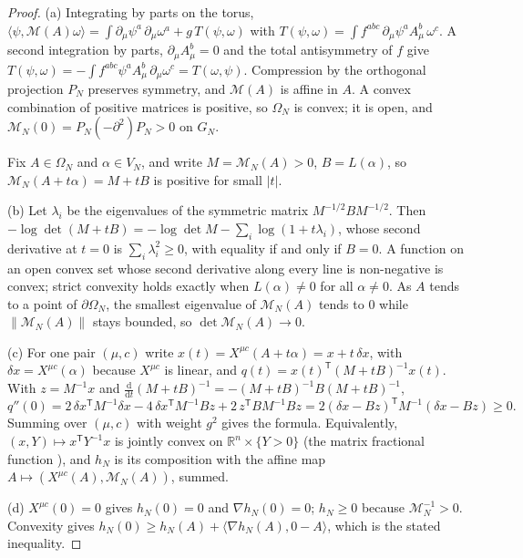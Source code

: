 \documentclass[11pt,a4paper]{amsart}
\theoremstyle{definition}
\newcommand{\R}{\mathbb{R}}
\newcommand{\diff}{\mathrm{d}}
\begin{document}
\begin{proof}
(a) Integrating by parts on the torus, $\langle\psi,\mathcal{M}(A)\omega\rangle = \int \partial_\mu\psi^a\,\partial_\mu\omega^a + g\,T(\psi,\omega)$ with $T(\psi,\omega) = \int f^{abc}\,\partial_\mu\psi^a A^b_\mu\,\omega^c$. A second integration by parts, $\partial_\mu A^b_\mu = 0$ and the total antisymmetry of $f$ give $T(\psi,\omega) = -\int f^{abc}\psi^a A^b_\mu\,\partial_\mu\omega^c = T(\omega,\psi)$. Compression by the orthogonal projection $P_N$ preserves symmetry, and $\mathcal{M}(A)$ is affine in $A$. A convex combination of positive matrices is positive, so $\Omega_N$ is convex; it is open, and $\mathcal{M}_N(0) = P_N(-\partial^2)P_N > 0$ on $G_N$.

Fix $A \in \Omega_N$ and $\alpha \in V_N$, and write $M = \mathcal{M}_N(A) > 0$, $B = L(\alpha)$, so $\mathcal{M}_N(A + t\alpha) = M + tB$ is positive for small $|t|$.

(b) Let $\lambda_i$ be the eigenvalues of the symmetric matrix $M^{-1/2}BM^{-1/2}$. Then $-\log\det(M + tB) = -\log\det M - \sum_i\log(1 + t\lambda_i)$, whose second derivative at $t = 0$ is $\sum_i\lambda_i^2 \ge 0$, with equality if and only if $B = 0$. A function on an open convex set whose second derivative along every line is non-negative is convex; strict convexity holds exactly when $L(\alpha) \ne 0$ for all $\alpha \ne 0$. As $A$ tends to a point of $\partial\Omega_N$, the smallest eigenvalue of $\mathcal{M}_N(A)$ tends to $0$ while $\|\mathcal{M}_N(A)\|$ stays bounded, so $\det\mathcal{M}_N(A) \to 0$.

(c) For one pair $(\mu,c)$ write $x(t) = X^{\mu c}(A + t\alpha) = x + t\,\delta x$, with $\delta x = X^{\mu c}(\alpha)$ because $X^{\mu c}$ is linear, and $q(t) = x(t)^{\mathsf T}(M + tB)^{-1}x(t)$. With $z = M^{-1}x$ and $\frac{\diff}{\diff t}(M + tB)^{-1} = -(M + tB)^{-1}B(M + tB)^{-1}$,
\begin{equation*}
    q''(0) = 2\,\delta x^{\mathsf T}M^{-1}\delta x - 4\,\delta x^{\mathsf T}M^{-1}Bz + 2\,z^{\mathsf T}BM^{-1}Bz = 2(\delta x - Bz)^{\mathsf T}M^{-1}(\delta x - Bz) \ge 0 .
\end{equation*}
Summing over $(\mu,c)$ with weight $g^2$ gives the formula. Equivalently, $(x,Y) \mapsto x^{\mathsf T}Y^{-1}x$ is jointly convex on $\R^n \times \{Y > 0\}$ (the matrix fractional function \cite[Example~3.4]{boyd2004convex}), and $h_N$ is its composition with the affine map $A \mapsto (X^{\mu c}(A), \mathcal{M}_N(A))$, summed.

(d) $X^{\mu c}(0) = 0$ gives $h_N(0) = 0$ and $\nabla h_N(0) = 0$; $h_N \ge 0$ because $\mathcal{M}_N^{-1} > 0$. Convexity gives $h_N(0) \ge h_N(A) + \langle\nabla h_N(A), 0 - A\rangle$, which is the stated inequality.


\end{proof}
\end{document}
